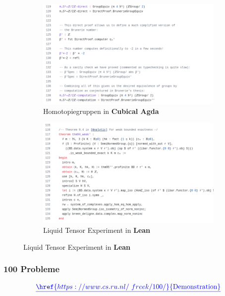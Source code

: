 \documentclass{beamer}
\theoremstyle{definition}
\theoremstyle{remark}
\begin{document}
\begin{frame}
\begin{figure}
		\vspace{0.2cm} %
		\begin{subfigure}[b]{0.45\textwidth}
						\includegraphics[width=\textwidth]{cubicalagda.png}
						\caption{\tiny Homotopiegruppen in \textbf{Cubical Agda}}
		\end{subfigure}
		\hspace{0.5cm}
		\begin{subfigure}[b]{0.45\textwidth}
						\includegraphics[width=\textwidth]{liquidtensor.png}
						\caption{\tiny Liquid Tensor Experiment in \textbf{Lean}}
		\end{subfigure}
	
\end{figure}
\end{frame}

\begin{frame}
	\frametitle{100 Probleme}
	\[
		{\color{blue}\underline{\href{https://www.cs.ru.nl/~freek/100/}{\text{Demonstration}}}}
	\]
\end{frame}
\end{document}
